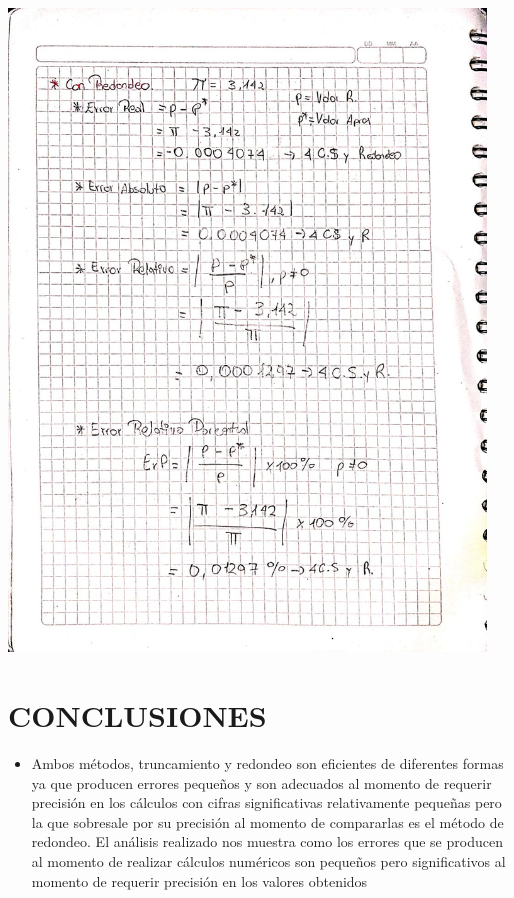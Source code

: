 \documentclass[12pt]{article}
\begin{document}
\vspace{0.5cm}
\begin{minipage}{0.95\textwidth}
    \raggedleft
    \includegraphics[width=0.95\textwidth]{inFiles/Figures/img2.jpeg}
\end{minipage}

\vspace{3cm}

\section*{CONCLUSIONES}
\begin{itemize}
    \item {Ambos métodos, truncamiento y redondeo son eficientes de diferentes
    formas ya que producen errores pequeños y son adecuados al momento de requerir
    precisión en los cálculos con cifras significativas relativamente pequeñas
    pero la que sobresale por su precisión al momento de compararlas es el método
    de redondeo.
    El análisis realizado nos muestra como los errores que se producen al momento de
    realizar cálculos numéricos son pequeños pero significativos al momento de requerir precisión
    en los valores obtenidos}
\end{itemize}


\vspace{0.5cm}
\end{document}
